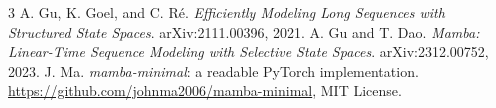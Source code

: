 \documentclass[10pt,a4paper]{article}
\begin{document}
\begin{thebibliography}{3}\small
{} A. Gu, K. Goel, and C. R\'e. \emph{Efficiently Modeling Long Sequences with Structured State Spaces}. arXiv:2111.00396, 2021.
 A. Gu and T. Dao. \emph{Mamba: Linear-Time Sequence Modeling with Selective State Spaces}. arXiv:2312.00752, 2023.
 J. Ma. \emph{mamba-minimal}: a readable PyTorch implementation. \url{https://github.com/johnma2006/mamba-minimal}, MIT License.
\end{thebibliography}
\end{document}
